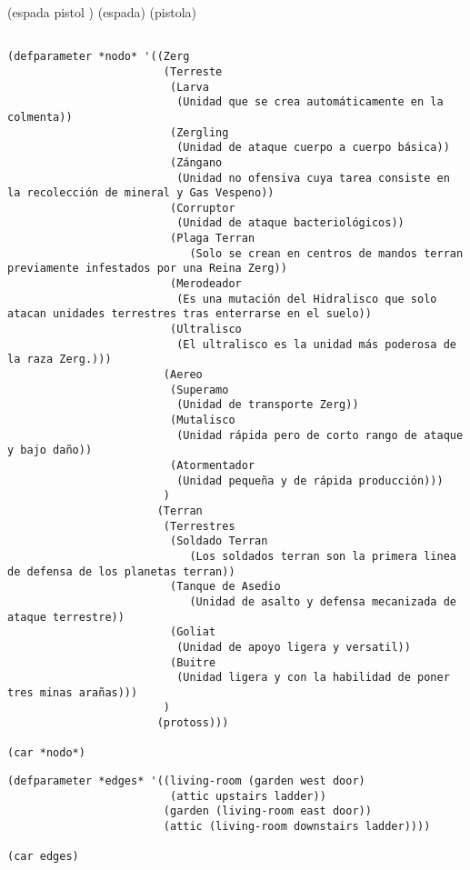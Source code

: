 \documentclass[11pt]{article}
\begin{document}
(espada pistol  )
(espada) (pistola) 
\begin{verbatim}

(defparameter *nodo* '((Zerg
						(Terreste
						 (Larva
						  (Unidad que se crea automáticamente en la colmenta))
						 (Zergling
						  (Unidad de ataque cuerpo a cuerpo básica))
						 (Zángano
						  (Unidad no ofensiva cuya tarea consiste en la recolección de mineral y Gas Vespeno)) 
						 (Corruptor
						  (Unidad de ataque bacteriológicos))
						 (Plaga Terran
							(Solo se crean en centros de mandos terran previamente infestados por una Reina Zerg))
						 (Merodeador
						  (Es una mutación del Hidralisco que solo atacan unidades terrestres tras enterrarse en el suelo))
						 (Ultralisco
						  (El ultralisco es la unidad más poderosa de la raza Zerg.)))
						(Aereo
						 (Superamo
						  (Unidad de transporte Zerg))
						 (Mutalisco
						  (Unidad rápida pero de corto rango de ataque y bajo daño))
						 (Atormentador
						  (Unidad pequeña y de rápida producción)))
						)
					   (Terran
						(Terrestres
						 (Soldado Terran
							(Los soldados terran son la primera linea de defensa de los planetas terran))
						 (Tanque de Asedio
							(Unidad de asalto y defensa mecanizada de ataque terrestre))
						 (Goliat
						  (Unidad de apoyo ligera y versatil))
						 (Buitre
						  (Unidad ligera y con la habilidad de poner tres minas arañas)))
						)
					   (protoss)))

(car *nodo*)

\end{verbatim}


\begin{verbatim}
(defparameter *edges* '((living-room (garden west door)
						 (attic upstairs ladder))
						(garden (living-room east door))
						(attic (living-room downstairs ladder))))

(car edges)

\end{verbatim}
\end{document}
